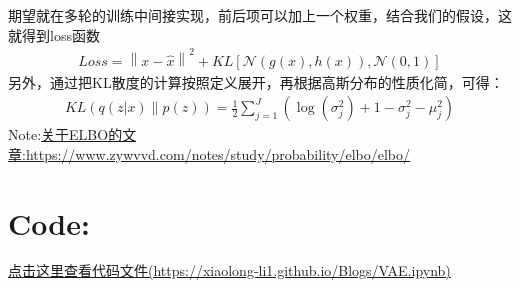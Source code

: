 \documentclass[]{report}
\begin{document}
\FloatBarrier
期望就在多轮的训练中间接实现，前后项可以加上一个权重，结合我们的假设，这就得到loss函数
\begin{align}
	Loss = \left\|x - \hat{x}\right\|^{2} + KL\left[\mathcal{N}(g(x), h(x)), \mathcal{N}(0, 1)\right]
\end{align}
另外，通过把KL散度的计算按照定义展开，再根据高斯分布的性质化简，可得：
\begin{align}
	KL(q(z|x) \parallel p(z)) = \frac{1}{2} \sum_{j=1}^{J} \left( \log(\sigma_j^2) + 1 - \sigma_j^2 - \mu_j^2 \right)
\end{align}
Note:\href{https://www.zywvvd.com/notes/study/probability/elbo/elbo/}{关于ELBO的文章:https://www.zywvvd.com/notes/study/probability/elbo/elbo/}
\section{Code:}
\href{./VAE.ipynb}{点击这里查看代码文件(https://xiaolong-li1.github.io/Blogs/VAE.ipynb)}
\end{document}
